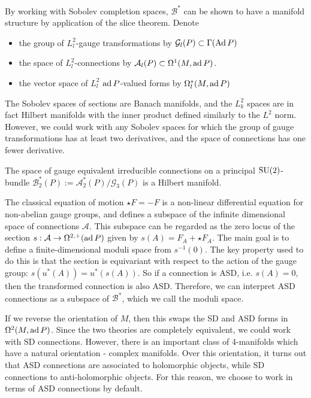 By working with Sobolev completion
spaces, $\mathcal{B}^*$ can be shown to have a manifold structure by 
application of the slice theorem. Denote
\begin{itemize}
	\item the group of $L^2_l$-gauge transformations by $\mathcal{G}_l(P) \subset
\Gamma(\operatorname{Ad} P)$ 
	\item the space of $L^2_l$-connections by $\mathcal{A}_l(P) \subset
\Omega^1(M,\operatorname{ad} P)$. 
	\item the vector space of $L^2_l$ $\operatorname{ad} P$-valued forms by  $\Omega^*_{l}(M,\operatorname{ad} P)$
\end{itemize}
The Sobolev spaces of sections are Banach manifolds, and 
the $L^2_k$ spaces are in fact Hilbert manifolds with the inner product defined
similarly to the $L^2$ norm. However, we could work with
any Sobolev spaces for which the group of gauge transformations has at least two
derivatives, and the space of connections has one fewer derivative. 

\begin{thm} 
	The space of gauge equivalent irreducible connections
    on a principal $\operatorname{SU}(2)$-bundle
	$\mathcal{B}^*_2(P) := \mathcal{A}^*_2(P) / \mathcal{G}_3(P)$ is a 
	Hilbert manifold. 
\end{thm}

The classical equation of motion $\star F = - F$ is a non-linear differential equation for
non-abelian gauge groups, and defines a subspace of the infinite dimensional
space of connections $\mathcal{A}$. This subspace can be regarded as the zero
locus of the section $s : \mathcal{A} \to \Omega^{2,+}(\operatorname{ad} P)$ given by $s(A) =
F_A+\star F_A$. The main goal is to define a finite-dimensional moduli space
from  $s^{-1}(0)$. 
The key property used to do this is that the section is equivariant with respect
to the action of the gauge group: $s(u^*(A))=u^*(s(A))$. 
So if a connection is ASD, i.e. $s(A)=0$, then the transformed connection is
also ASD. Therefore, we can interpret ASD connections as a subspace of 
$\mathcal{B}^*$, which we call the moduli space.


\begin{remark}
If we reverse the orientation of $M$, then this swaps the SD and ASD forms in
$\Omega^2(M,\operatorname{ad} P)$. Since the two theories are completely
equivalent, we could work with SD connections. However, there is an
important class of 4-manifolds which have a natural orientation - complex
manifolds. Over this orientation, it turns out that ASD connections are 
associated to holomorphic objects, while SD connections to anti-holomorphic
objects.\cite[p.95]{morgan} For this reason, we choose to work in terms of 
ASD connections by default.
\end{remark}


